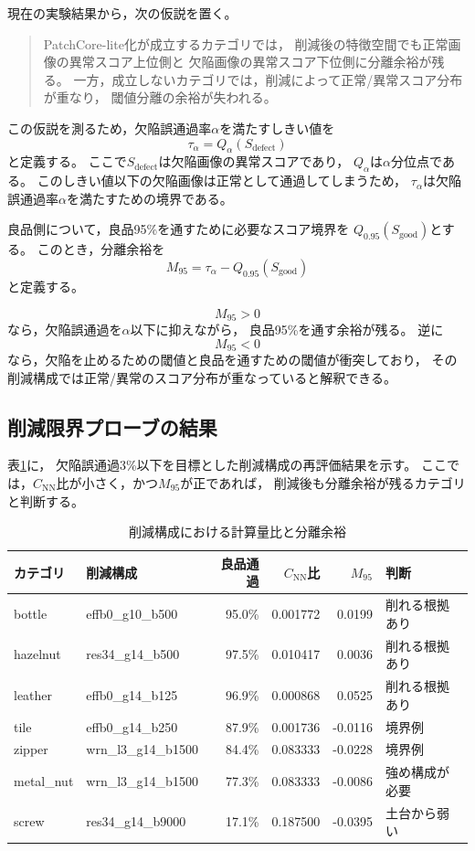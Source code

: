 \documentclass[uplatex,dvipdfmx,a4paper,11pt]{jsarticle}
\begin{document}
現在の実験結果から，次の仮説を置く。

\begin{quote}
PatchCore-lite化が成立するカテゴリでは，
削減後の特徴空間でも正常画像の異常スコア上位側と
欠陥画像の異常スコア下位側に分離余裕が残る。
一方，成立しないカテゴリでは，削減によって正常/異常スコア分布が重なり，
閾値分離の余裕が失われる。
\end{quote}

この仮説を測るため，欠陥誤通過率$\alpha$を満たすしきい値を
\[
  \tau_{\alpha} = Q_{\alpha}(S_{\mathrm{defect}})
\]
と定義する。
ここで$S_{\mathrm{defect}}$は欠陥画像の異常スコアであり，
$Q_{\alpha}$は$\alpha$分位点である。
このしきい値以下の欠陥画像は正常として通過してしまうため，
$\tau_{\alpha}$は欠陥誤通過率$\alpha$を満たすための境界である。

良品側について，良品95\%を通すために必要なスコア境界を
$Q_{0.95}(S_{\mathrm{good}})$とする。
このとき，分離余裕を
\[
  M_{95} =
  \tau_{\alpha} - Q_{0.95}(S_{\mathrm{good}})
\]
と定義する。

\[
  M_{95} > 0
\]
なら，欠陥誤通過を$\alpha$以下に抑えながら，
良品95\%を通す余裕が残る。
逆に
\[
  M_{95} < 0
\]
なら，欠陥を止めるための閾値と良品を通すための閾値が衝突しており，
その削減構成では正常/異常のスコア分布が重なっていると解釈できる。

\subsection{削減限界プローブの結果}

表\ref{tab:reduction-limit-probe}に，
欠陥誤通過3\%以下を目標とした削減構成の再評価結果を示す。
ここでは，$C_{\mathrm{NN}}$比が小さく，かつ$M_{95}$が正であれば，
削減後も分離余裕が残るカテゴリと判断する。

\begin{table}[t]
  \centering
  \caption{削減構成における計算量比と分離余裕}
  \label{tab:reduction-limit-probe}
  \begin{tabular}{llrrrp{35mm}}
    \toprule
    カテゴリ & 削減構成 & 良品通過 & $C_{\mathrm{NN}}$比 & $M_{95}$ & 判断 \\
    \midrule
    bottle & effb0\_g10\_b500 & 95.0\% & 0.001772 & 0.0199 & 削れる根拠あり \\
    hazelnut & res34\_g14\_b500 & 97.5\% & 0.010417 & 0.0036 & 削れる根拠あり \\
    leather & effb0\_g14\_b125 & 96.9\% & 0.000868 & 0.0525 & 削れる根拠あり \\
    tile & effb0\_g14\_b250 & 87.9\% & 0.001736 & -0.0116 & 境界例 \\
    zipper & wrn\_l3\_g14\_b1500 & 84.4\% & 0.083333 & -0.0228 & 境界例 \\
    metal\_nut & wrn\_l3\_g14\_b1500 & 77.3\% & 0.083333 & -0.0086 & 強め構成が必要 \\
    screw & res34\_g14\_b9000 & 17.1\% & 0.187500 & -0.0395 & 土台から弱い \\
    \bottomrule
  \end{tabular}
\end{table}
\end{document}
